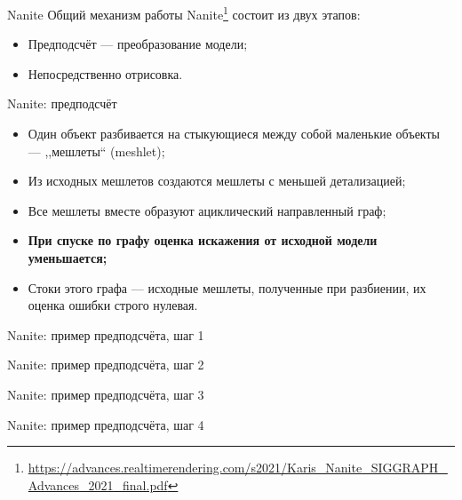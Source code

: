 \documentclass{beamer}
\begin{document}
    \begin{frame}{Nanite}
        Общий механизм работы Nanite\footnote{\url{https://advances.realtimerendering.com/s2021/Karis_Nanite_SIGGRAPH_Advances_2021_final.pdf}} состоит из двух этапов:
        \begin{itemize}
            \item Предподсчёт --- преобразование модели;
            \item Непосредственно отрисовка.
        \end{itemize}
    \end{frame}

    \begin{frame}{Nanite: предподсчёт}
        \begin{itemize}
            \item Один объект разбивается на стыкующиеся между собой маленькие объекты --- ,,мешлеты`` (meshlet);
            \item Из исходных мешлетов создаются мешлеты с меньшей детализацией;
            \item Все мешлеты вместе образуют ациклический направленный граф;
            \item \textbf{При спуске по графу оценка искажения от исходной модели уменьшается;}
            \item Стоки этого графа --- исходные мешлеты, полученные при разбиении, их оценка ошибки строго нулевая.
        \end{itemize}
    \end{frame}

    \begin{frame}{Nanite: пример предподсчёта, шаг 1}
        \centering 
    \end{frame}

    \begin{frame}{Nanite: пример предподсчёта, шаг 2}
        \centering 
    \end{frame}

    \begin{frame}{Nanite: пример предподсчёта, шаг 3}
        \centering 
    \end{frame}

    \begin{frame}{Nanite: пример предподсчёта, шаг 4}
        \centering 
    \end{frame}
\end{document}
